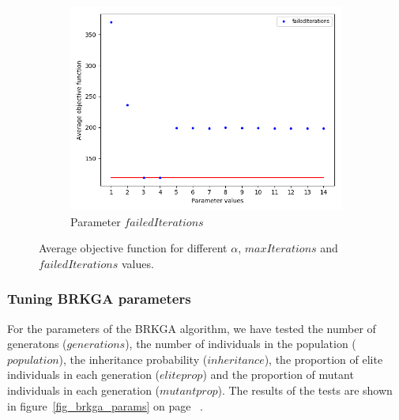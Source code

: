 \begin{figure}[h!]
\begin{subfigure}[b]{.49\linewidth}
\includegraphics[width=\linewidth]{./img/best-lsiteration.png}
\caption{Parameter $failedIterations$ }\label{fig1c}
\end{subfigure}%
\caption{Average objective function for different  $\alpha$,  $maxIterations$ and   $failedIterations$ values.  }
\label{fig_grasp_params}
\end{figure}


\pagebreak

\subsubsection{Tuning BRKGA parameters}

For the parameters of the BRKGA algorithm, we have tested the number of generatons ($generations$), the number of individuals in the population ($population$), the inheritance probability ($inheritance$), the proportion of elite individuals in each generation ($eliteprop$) and the proportion of mutant individuals in each generation ($mutantprop$). The results of the tests are shown in figure~\ref{fig_brkga_params} on page~\pageref{fig_brkga_params} .\\

